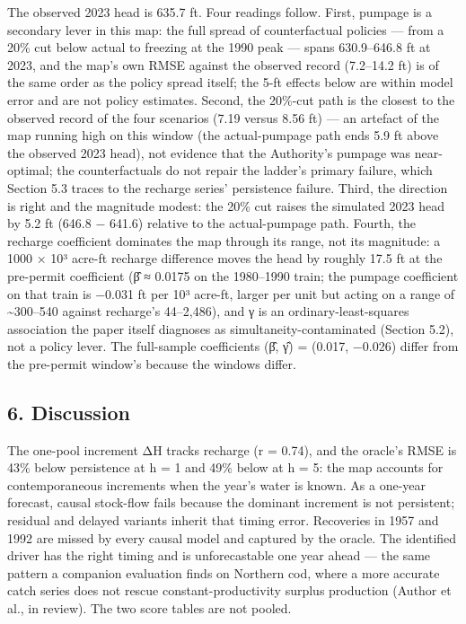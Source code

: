 \documentclass[11pt]{article}
\begin{document}
The observed 2023 head is 635.7 ft. Four readings follow. First, pumpage
is a secondary lever in this map: the full spread of counterfactual
policies --- from a 20\% cut below actual to freezing at the 1990 peak
--- spans 630.9--646.8 ft at 2023, and the map's own RMSE against the
observed record (7.2--14.2 ft) is of the same order as the policy spread
itself; the 5-ft effects below are within model error and are not policy
estimates. Second, the 20\%-cut path is the closest to the observed
record of the four scenarios (7.19 versus 8.56 ft) --- an artefact of
the map running high on this window (the actual-pumpage path ends 5.9 ft
above the observed 2023 head), not evidence that the Authority's pumpage
was near-optimal; the counterfactuals do not repair the ladder's primary
failure, which Section 5.3 traces to the recharge series' persistence
failure. Third, the direction is right and the magnitude modest: the
20\% cut raises the simulated 2023 head by 5.2 ft (646.8 − 641.6)
relative to the actual-pumpage path. Fourth, the recharge coefficient
dominates the map through its range, not its magnitude: a 1000 × 10³
acre-ft recharge difference moves the head by roughly 17.5 ft at the
pre-permit coefficient (β̂ ≈ 0.0175 on the 1980--1990 train; the pumpage
coefficient on that train is −0.031 ft per 10³ acre-ft, larger per unit
but acting on a range of \textasciitilde300--540 against recharge's
44--2,486), and γ is an ordinary-least-squares association the paper
itself diagnoses as simultaneity-contaminated (Section 5.2), not a
policy lever. The full-sample coefficients (β̂, γ̂) = (0.017, −0.026)
differ from the pre-permit window's because the windows differ.

\subsection{6. Discussion}\label{discussion}

The one-pool increment ΔH tracks recharge (r = 0.74), and the oracle's
RMSE is 43\% below persistence at h = 1 and 49\% below at h = 5: the map
accounts for contemporaneous increments when the year's water is known.
As a one-year forecast, causal stock-flow fails because the dominant
increment is not persistent; residual and delayed variants inherit that
timing error. Recoveries in 1957 and 1992 are missed by every causal
model and captured by the oracle. The identified driver has the right
timing and is unforecastable one year ahead --- the same pattern a
companion evaluation finds on Northern cod, where a more accurate catch
series does not rescue constant-productivity surplus production (Author
et al., in review). The two score tables are not pooled.
\end{document}
